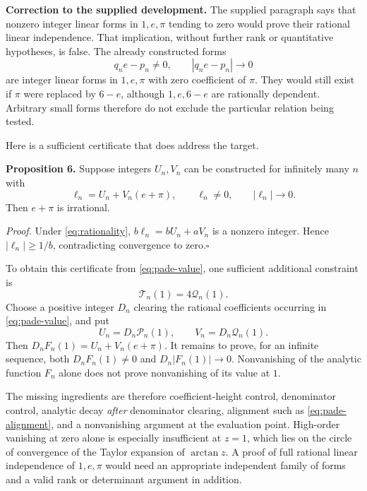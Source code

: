 \documentclass[11pt]{article}
\begin{document}
\textbf{Correction to the supplied development.}
The supplied paragraph says that nonzero integer linear forms in
$1,e,\pi$ tending to zero would prove their rational linear independence.
That implication, without further rank or quantitative hypotheses, is
false. The already constructed forms
\[
 q_ne-p_n\ne0,\qquad |q_ne-p_n|\longrightarrow0
\]
are integer linear forms in $1,e,\pi$ with zero coefficient of $\pi$.
They would still exist if $\pi$ were replaced by $6-e$, although
$1,e,6-e$ are rationally dependent. Arbitrary small forms therefore do
not exclude the particular relation being tested.

Here is a sufficient certificate that does address the target.

\textbf{Proposition 6.} Suppose integers $U_n,V_n$ can be constructed for
infinitely many $n$ with
\begin{equation}\label{eq:aligned-certificate}
 \ell_n=U_n+V_n(e+\pi),\qquad
 \ell_n\ne0,\qquad |\ell_n|\longrightarrow0.
\end{equation}
Then $e+\pi$ is irrational.

\emph{Proof.} Under \eqref{eq:rationality},
$b\ell_n=bU_n+aV_n$ is a nonzero integer. Hence
$|\ell_n|\ge1/b$, contradicting convergence to zero.\hfill$\square$

To obtain this certificate from \eqref{eq:pade-value}, one sufficient
additional constraint is
\begin{equation}\label{eq:pade-alignment}
 \mathcal T_n(1)=4\mathcal Q_n(1).
\end{equation}
Choose a positive integer $D_n$ clearing the rational coefficients
occurring in \eqref{eq:pade-value}, and put
\[
 U_n=D_n\mathcal P_n(1),\qquad
 V_n=D_n\mathcal Q_n(1).
\]
Then $D_nF_n(1)=U_n+V_n(e+\pi)$. It remains to prove, for an infinite
sequence, both $D_nF_n(1)\ne0$ and $D_n|F_n(1)|\to0$.
Nonvanishing of the analytic function $F_n$ alone does not prove
nonvanishing of its value at $1$.

The missing ingredients are therefore coefficient-height control,
denominator control, analytic decay \emph{after} denominator clearing,
alignment such as \eqref{eq:pade-alignment}, and a nonvanishing argument
at the evaluation point. High-order vanishing at zero alone is especially
insufficient at $z=1$, which lies on the circle of convergence of the
Taylor expansion of $\arctan z$. A proof of full rational linear
independence of $1,e,\pi$ would need an appropriate independent family of
forms and a valid rank or determinant argument in addition.
\end{document}
